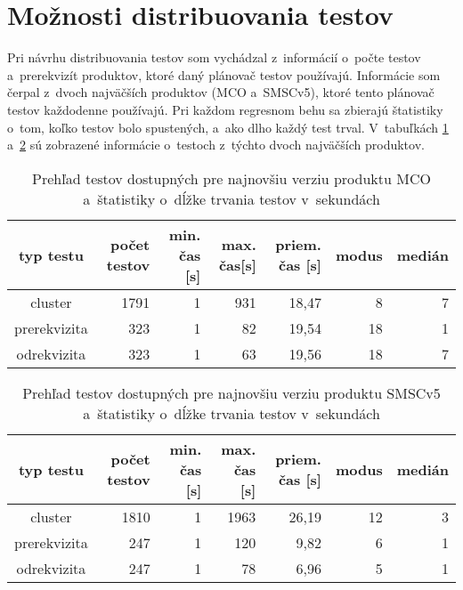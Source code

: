 \section{Možnosti distribuovania testov}
\label{sekcia:moznosti_distribuovania}
Pri návrhu distribuovania testov som vychádzal z~informácií o~počte 
testov a~prerekvizít produktov, ktoré daný plánovač testov používajú. 
Informácie som čerpal z~dvoch najväčších produktov (MCO a~SMSCv5), 
ktoré tento plánovač testov každodenne používajú. 
Pri každom regresnom behu sa zbierajú štatistiky o~tom,
koľko testov bolo spustených, a~ako dlho každý test trval. 
V~tabuľkách \ref{tabulka:testy_mco} a~\ref{tabulka:testy_smsc} sú 
zobrazené informácie o~testoch z~týchto dvoch najväčších produktov.

\begin{table}
  \begin{center}
    \begin{tabular}{| c | r | r | r | r | r | r |}
    \hline
    typ testu & počet testov & min. čas [s] & max. čas[s] & 
    priem. čas [s] & modus & medián \\ \hline
    cluster      & 1791 & 1 & 931 & 18,47 & 8  & 7 \\ \hline
    prerekvizita & 323  & 1 & 82  & 19,54 & 18 & 1 \\ \hline
    odrekvizita  & 323  & 1 & 63  & 19,56 & 18 & 7 \\
    \hline
    \end{tabular}
    \caption{Prehľad testov dostupných pre najnovšiu verziu produktu MCO 
             a~štatistiky o~dĺžke trvania testov v~sekundách}
    \label{tabulka:testy_mco}
  \end{center}
\end{table}

\begin{table}
  \begin{center}
    \begin{tabular}{| c | r | r | r | r | r | r |}
    \hline
    typ testu & počet testov & min. čas [s] & max. čas [s] & 
    priem. čas [s] & modus & medián \\ \hline
    cluster      & 1810 & 1 & 1963 & 26,19 & 12 & 3 \\ \hline
    prerekvizita & 247  & 1 & 120  & 9,82  & 6  & 1 \\ \hline
    odrekvizita  & 247  & 1 & 78   & 6,96  & 5  & 1 \\
    \hline
    \end{tabular}
    \caption{Prehľad testov dostupných pre najnovšiu verziu produktu SMSCv5 
             a~štatistiky o~dĺžke trvania testov v~sekundách}
    \label{tabulka:testy_smsc}
  \end{center}
\end{table}

